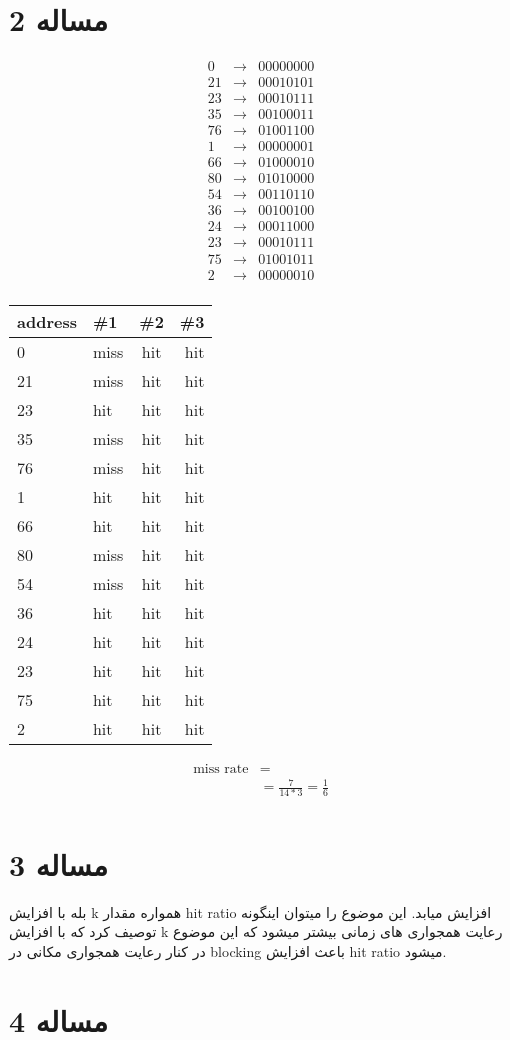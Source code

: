 \documentclass[11pt]{article}
\begin{document}
\section{مساله 2}
\begin{align*}
	0& \rightarrow &0000 0000 \\
	21& \rightarrow &0001 0101 \\
	23& \rightarrow &0001 0111 \\
	35& \rightarrow &0010 0011 \\
	76& \rightarrow &0100 1100 \\
	1& \rightarrow  &0000 0001 \\
	66& \rightarrow &0100 0010 \\
	80& \rightarrow &0101 0000 \\
	54& \rightarrow &0011 0110 \\
	36& \rightarrow &0010 0100 \\
	24& \rightarrow &0001 1000 \\
	23& \rightarrow &0001 0111 \\
	75& \rightarrow &0100 1011 \\
	2& \rightarrow &0000 0010 \\
\end{align*}
\begin{center}
	\begin{tabular}{l || l | c | r}
		address & \#1 & \#2 & \#3 \\
		\hline
		0  & miss & hit & hit \\
		21 & miss & hit & hit \\
		23 & hit  & hit & hit \\
		35 & miss & hit & hit \\
		76 & miss & hit & hit \\
		1  & hit  & hit & hit \\
		66 & hit  & hit & hit \\
		80 & miss & hit & hit \\
		54 & miss & hit & hit \\
		36 & hit  & hit & hit \\
		24 & hit  & hit & hit \\
		23 & hit  & hit & hit \\
		75 & hit  & hit & hit \\
		2  & hit  & hit & hit \\
	\end{tabular}
\end{center}
\begin{align*}
	\text{miss rate} &= \\
	&= \frac{7}{14 * 3} = \frac{1}{6} \\
\end{align*}
\section{مساله 3}
بله با افزایش k همواره مقدار hit ratio افزایش میابد. این موضوع را میتوان اینگونه توصیف کرد که با افزایش k رعایت همجواری های زمانی بیشتر میشود که این موضوع در کنار رعایت همجواری مکانی در blocking باعث افزایش hit ratio میشود.
\section{مساله 4}
\end{document}
